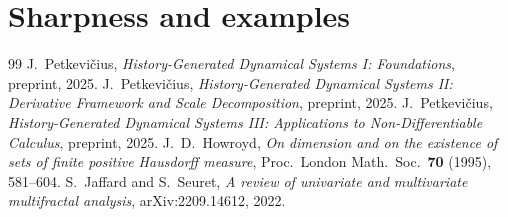 \documentclass[10pt,a4paper]{amsart}
\begin{document}
\section{Sharpness and examples}\label{sec:sharp}


\begin{thebibliography}{99}
 J.~Petkevi\v{c}ius, \textit{History-Generated Dynamical Systems I: Foundations}, preprint, 2025.
 J.~Petkevi\v{c}ius, \textit{History-Generated Dynamical Systems II: Derivative Framework and Scale Decomposition}, preprint, 2025.
 J.~Petkevi\v{c}ius, \textit{History-Generated Dynamical Systems III: Applications to Non-Differentiable Calculus}, preprint, 2025.
 J.~D.~Howroyd, \textit{On dimension and on the existence of sets of finite positive Hausdorff measure}, Proc.\ London Math.\ Soc.\ \textbf{70} (1995), 581--604.
 S.~Jaffard and S.~Seuret, \textit{A review of univariate and multivariate multifractal analysis}, arXiv:2209.14612, 2022.
\end{thebibliography}
\end{document}

